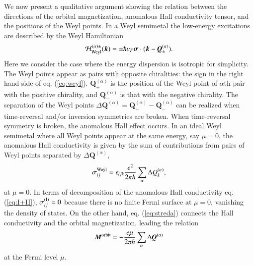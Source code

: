 \documentclass[letter,twocolumn,amsmath,amssymb,superscriptaddress]{jpsj3}
\newcommand{\vM}{\bm{M}}
\newcommand{\vk}{\bm{k}}
\newcommand{\vs}{\bm{\sigma}}
\newcommand{\vQ}{\bm{Q}}
\begin{document}
We now present a qualitative argument showing the relation between the directions of the orbital magnetization, anomalous Hall conductivity tensor, and the positions of the Weyl points.
In a Weyl semimetal
the low-energy excitations are described by the Weyl Hamiltonian\cite{Wan2011,Burkov2011}
\begin{equation}
{\cal H}_{\rm Weyl}^{(\alpha)\pm}(\vk)
=\pm \hbar v_F\vs \cdot(\vk - \vQ^{(\alpha)}_\pm).
\label{eq:weyl}
\end{equation}
Here we consider the case where the energy dispersion is isotropic for simplicity.
The Weyl points appear as pairs with opposite chiralities: the sign in the right hand side of eq. (\ref{eq:weyl}).
$\vQ^{(\alpha)}_+$ is the position of the Weyl point of $\alpha$th pair with the positive chirality, and $\vQ^{(\alpha)}_-$ is that with the negative chirality.
The separation of the Weyl points $\Delta\vQ^{(\alpha)}=\vQ^{(\alpha)}_+-\vQ^{(\alpha)}_-$ can be realized when time-reversal and/or inversion symmetries are broken.
When time-reversal symmetry is broken, the anomalous Hall effect occurs. 
In an ideal Weyl semimetal where all Weyl points appear at the same energy, say $\mu=0$, the anomalous Hall conductivity is given by the sum of contributions from pairs of Weyl points separated by $\Delta{\bm Q}^{(\alpha)}$,
\begin{equation}
  \sigma^{\rm Weyl}_{ij}=\epsilon_{ijk}\frac{e^2}{2\pi h}\sum_{\alpha}\Delta Q_k^{(\alpha)},
\label{AHC_Weyl}
\end{equation}
at $\mu=0$.\cite{Wan2011,Burkov2011}
In terms of decomposition of the anomalous Hall conductivity eq. (\ref{eq:I+II}), $\sigma^{({\rm I})}_{ij}=0$ because there is no finite Fermi surface at $\mu=0$, vanishing the density of states.
On the other hand, eq. (\ref{eq:streda}) connects the Hall conductivity and the orbital magnetization, leading the relation \cite{note}
\begin{equation}
  \vM^{\rm orbit} = -\frac{e \mu}{2\pi h} \sum_{\alpha} \Delta\vQ^{(\alpha)}
\label{M_Weyl}
\end{equation}
at the Fermi level $\mu$.
\end{document}
